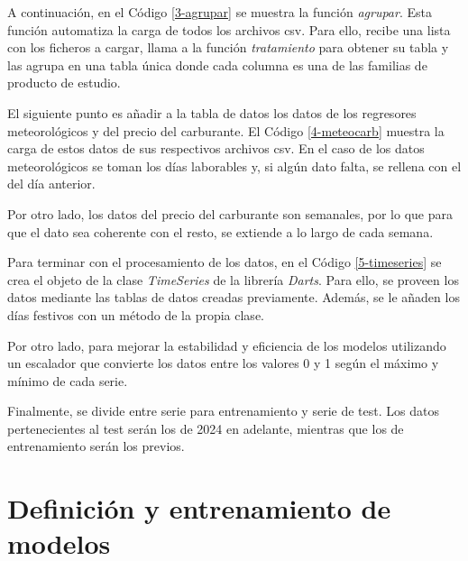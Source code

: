 

A continuación, en el Código \ref*{3-agrupar} se muestra la función \textit{agrupar}. Esta función automatiza la carga de todos los archivos csv. Para ello, recibe una lista con los ficheros a cargar, llama a la función \textit{tratamiento} para obtener su tabla y las agrupa en una tabla única donde cada columna es una de las familias de producto de estudio.



El siguiente punto es añadir a la tabla de datos los datos de los regresores meteorológicos y del precio del carburante. El Código \ref*{4-meteocarb} muestra la carga de estos datos de sus respectivos archivos csv. En el caso de los datos meteorológicos se toman los días laborables y, si algún dato falta, se rellena con el del día anterior.

Por otro lado, los datos del precio del carburante son semanales, por lo que para que el dato sea coherente con el resto, se extiende a lo largo de cada semana.



Para terminar con el procesamiento de los datos, en el Código \ref*{5-timeseries} se crea el objeto de la clase \textit{TimeSeries} de la librería \textit{Darts}. Para ello, se proveen los datos mediante las tablas de datos creadas previamente. Además, se le añaden los días festivos con un método de la propia clase.

Por otro lado, para mejorar la estabilidad y eficiencia de los modelos utilizando un escalador que convierte los datos entre los valores 0 y 1 según el máximo y mínimo de cada serie.

Finalmente, se divide entre serie para entrenamiento y serie de test. Los datos pertenecientes al test serán los de 2024 en adelante, mientras que los de entrenamiento serán los previos.




\section{Definición y entrenamiento de modelos}\label{cap4-entreno}

